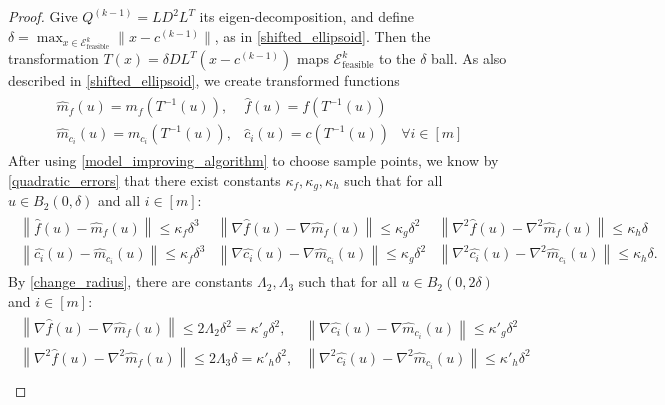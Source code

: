 \documentclass{article}
\theoremstyle{case}
\numberwithin{theorem}{subsection}
\newcommand{\unshiftedellipsoid}{{\mathcal E^k_{\textrm{feasible}}}}
\newcommand{\qkmo}{{Q^{(k-1)}}}
\newcommand{\ckmo}{{c^{(k-1)}}}
\begin{document}
\begin{proof}
Give $\qkmo = LD^2L^T$ its eigen-decomposition, and define $\delta = \max_{x \in \unshiftedellipsoid} \|x - \ckmo\|$, as in \cref{shifted_ellipsoid}.
Then the transformation $T(x) = \delta D L^T(x - \ckmo)$ maps $\unshiftedellipsoid$ to the $\delta$ ball.
As also described in \cref{shifted_ellipsoid}, we create transformed functions
\begin{align*}
\begin{array}{ccc}
\hat {m}_f(u) = m_f(T^{-1}(u)),&  \hat f (u) = f(T^{-1}(u)) &\\
\hat {m}_{c_i}(u) = m_{c_i}(T^{-1}(u)), &  \hat c_i (u) = c(T^{-1}(u))& \forall i \in [m]
\end{array}
\end{align*}
After using \cref{model_improving_algorithm} to choose sample points, we know by \cref{quadratic_errors} that
there exist constants $\kappa_f, \kappa_g, \kappa_h$ such that for all $u \in B_2(0, \delta)$ and all $i \in [m]$:
\begin{align*}
\begin{array}{ccc}
\left\| \hat {f}\left(u\right) -  \hat{m}_f\left(u\right) \right\|\le \kappa_f \delta^3 &
\left\|\nabla \hat {f}\left(u\right) - \nabla \hat{m}_f\left(u\right) \right\|\le \kappa_g \delta^2 &
\left\|\nabla^2 \hat {f}\left(u\right) - \nabla^2 \hat{m}_f\left(u\right) \right\|\le \kappa_h \delta \\
\left\| \hat {{c_i}}\left(u\right) -  \hat{m}_{c_i}\left(u\right) \right\|\le \kappa_f \delta^3 &
\left\|\nabla \hat {{c_i}}\left(u\right) - \nabla \hat{m}_{c_i}\left(u\right) \right\|\le \kappa_g \delta^2 &
\left\|\nabla^2 \hat {{c_i}}\left(u\right) - \nabla^2 \hat{m}_{c_i}\left(u\right) \right\|\le \kappa_h \delta.
\end{array}
\end{align*}
By \cref{change_radius}, there are constants $\Lambda_2, \Lambda_3$ such that for all $u \in B_2(0, 2\delta)$ and $i \in [m]$:
\begin{align*}
\begin{array}{cc}
\left\|\nabla \hat {f}\left(u\right) - \nabla \hat{m}_f\left(u\right) \right\|\le 2\Lambda_2 \delta^2 = {\kappa'}_g\delta^2, &
\left\|\nabla \hat {c_i}\left(u\right) - \nabla \hat{m}_{c_i}\left(u\right) \right\|\le {\kappa'}_g\delta^2 \\
\left\|\nabla^2 \hat {f}\left(u\right) - \nabla^2 \hat{m}_f\left(u\right) \right\|\le 2\Lambda_3 \delta = {\kappa'}_h\delta^2, &
\left\|\nabla^2 \hat {c_i}\left(u\right) - \nabla^2 \hat{m}_{c_i}\left(u\right) \right\|\le {\kappa'}_h\delta^2 \\

\end{array}
\end{align*}
\end{proof}
\end{document}
